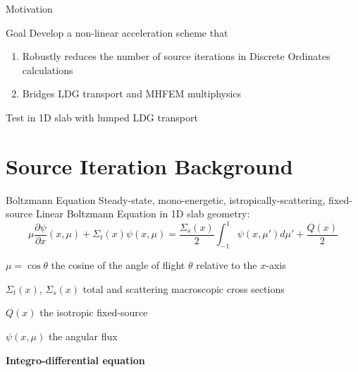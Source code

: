 \documentclass[10pt]{beamer}
\newcommand{\ud}{\mathop{}\!\mathrm{d}} %
\newcommand{\pderiv}[2]{\frac{\partial #1}{\partial #2}}
\begin{document}
\begin{frame}{Motivation}
    \begin{block}{Goal}
        Develop a non-linear acceleration scheme that 
            \begin{enumerate} \vspace{-.05in}
                \item Robustly reduces the number of source iterations in Discrete Ordinates calculations 
                \item Bridges LDG transport and MHFEM multiphysics
            \end{enumerate}
        \vspace{-.05in}
       	Test in 1D slab with lumped LDG transport  
    \end{block}

\end{frame}

\section{Source Iteration Background}

\begin{frame}{Boltzmann Equation}
    Steady-state, mono-energetic, istropically-scattering, fixed-source \alert{Linear Boltzmann Equation} in 1D slab geometry:
    \begin{equation*}
        \mu \pderiv{\psi}{x}(x, \mu) + \Sigma_t(x) \psi(x,\mu) = 
        \frac{\Sigma_s(x)}{2} \int_{-1}^{1} \psi(x, \mu') d\mu' + \frac{Q(x)}{2}
    \end{equation*}

    $\mu = \cos \theta$ the cosine of the angle of flight $\theta$ relative to the $x$-axis

    $\Sigma_t(x)$, $\Sigma_s(x)$ total and scattering macroscopic cross sections 

    $Q(x)$ the isotropic fixed-source

    $\psi(x,\mu)$ the angular flux 


    \vfill
    \centerline{\textbf{Integro-differential equation}}

\end{frame}
\end{document}

